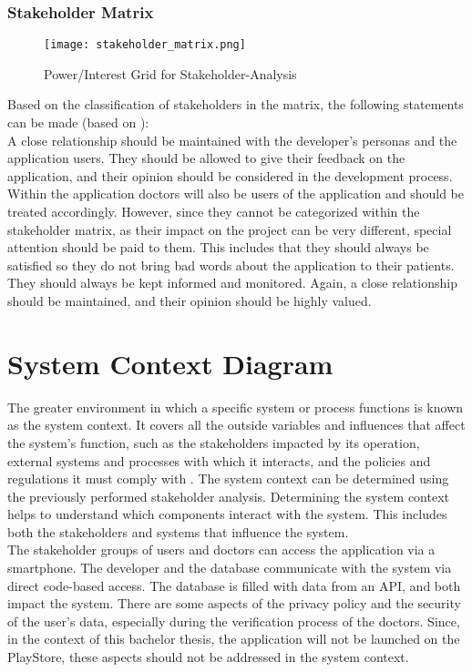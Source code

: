 \subsubsection{Stakeholder Matrix}
\begin{figure}[H]
	\centering
	\texttt{[image: stakeholder\_matrix.png]}
	\caption[Power/Interest Grid for Stakeholder-Analysis ]{Power/Interest Grid for Stakeholder-Analysis}
\end{figure}
\noindent	
Based on the classification of stakeholders in the matrix, the following statements can be made (based on \cite{.stakes}):
\newline \\
A close relationship should be maintained with the developer's personas and the application users. They should be allowed to give their feedback on the application, and their opinion should be considered in the development process.
\newline \\ 
Within the application doctors will also be users of the application and should be treated accordingly. However, since they cannot be categorized within the stakeholder matrix, as their impact on the project can be very different, special attention should be paid to them. This includes that they should always be satisfied so they do not bring bad words about the application to their patients. They should always be kept informed and monitored. Again, a close relationship should be maintained, and their opinion should be highly valued.

\section{System Context Diagram}
The greater environment in which a specific system or process functions is known as the system context. It covers all the outside variables and influences that affect the system's function, such as the stakeholders impacted by its operation, external systems and processes with which it interacts, and the policies and regulations it must comply with \cite{.systemcontext}. The system context can be determined using the previously performed stakeholder analysis. Determining the system context helps to understand which components interact with the system. This includes both the stakeholders and systems that influence the system.
\newline \\
The stakeholder groups of users and doctors can access the application via a smartphone. The developer and the database communicate with the system via direct code-based access. The database is filled with data from an API, and both impact the system. There are some aspects of the privacy policy and the security of the user's data, especially during the verification process of the doctors. Since, in the context of this bachelor thesis, the application will not be launched on the PlayStore, these aspects should not be addressed in the system context.

